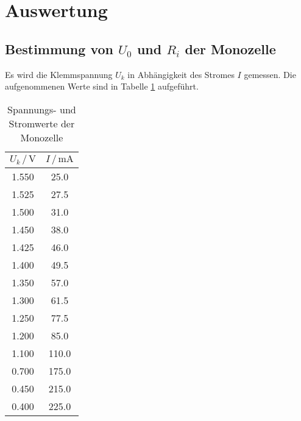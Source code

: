 \section{Auswertung}
\label{sec:Auswertung}

\subsection{Bestimmung von $U_0$ und $R_i$ der Monozelle}

Es wird die Klemmspannung $U_k$ in Abhängigkeit des Stromes $I$ gemessen. 
Die aufgenommenen Werte sind in Tabelle \ref{tab:Monozelle} aufgeführt. 

\begin{table}
\centering
\caption{Spannungs- und Stromwerte der Monozelle}
\label{tab:Monozelle}
\begin{tabular}{c c}
\toprule
$U_k \,/\, \si{\volt}$ & $I \,/\, \si{\milli\ampere}$\\
\midrule
1.550 & 25.0\\
1.525 &  27.5\\
1.500 &  31.0\\
1.450 &  38.0\\
1.425 &  46.0\\
1.400 &  49.5\\
1.350 &  57.0\\
1.300 &  61.5\\
1.250 &  77.5\\
1.200 &  85.0\\
1.100 & 110.0\\
0.700 & 175.0\\
0.450 & 215.0\\
0.400 & 225.0\\
\bottomrule
\end{tabular}
\end{table}

